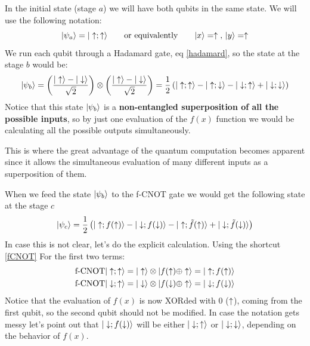 In the initial state (stage $a$) we will have both qubits in the same state. We will use the following notation:
\begin{equation}
  |\psi_{a}\rangle = |\uparrow;\uparrow\rangle \quad\quad\text{or equivalently}\quad\quad
  |x\rangle=\uparrow\text{, }|y\rangle=\uparrow
\end{equation}
We run each qubit through a Hadamard gate, eq \eqref{hadamard}, so the state at the stage $b$ would be:
\begin{equation}
  |\psi_{b}\rangle =
  \left(\frac{|\uparrow\rangle-|\downarrow\rangle}{\sqrt{2}}\right)\otimes
  \left(\frac{|\uparrow\rangle-|\downarrow\rangle}{\sqrt{2}}\right) =
  \frac{1}{2}\left(|\uparrow;\uparrow\rangle-|\uparrow;\downarrow\rangle-
  |\downarrow;\uparrow\rangle+|\downarrow;\downarrow\rangle\right)
\end{equation}
Notice that this state $|\psi_b\rangle$ is a \textbf{non-entangled superposition of all the possible inputs}, so by just one evaluation of the $f(x)$ function we would be calculating all the possible outputs simultaneously.

This is where the great advantage of the quantum computation becomes apparent since it allows the simultaneous evaluation of many different inputs as a superposition of them.

When we feed the state $|\psi_b\rangle$ to the f-CNOT gate we would get the following state at the stage $c$
\begin{equation}
  |\psi_{c}\rangle = \frac{1}{2}
  \left(|\uparrow;f(\uparrow)\rangle - |\downarrow;f(\downarrow)\rangle - |\uparrow;\tilde{f}(\uparrow)\rangle+
  |\downarrow;\tilde{f}(\downarrow)\rangle \right)
\end{equation}
In case this is not clear, let's do the explicit calculation. Using the shortcut \eqref{fCNOT}
For the first two terms:
\begin{equation}
  \begin{split}
    \text{f-CNOT}|\uparrow;\uparrow\rangle &=
    |\uparrow\rangle\otimes|f(\uparrow)\oplus\uparrow\rangle =|\uparrow;f(\uparrow)\rangle\\
    \text{f-CNOT}|\downarrow;\uparrow\rangle &=
    |\downarrow\rangle\otimes|f(\downarrow)\oplus \uparrow\rangle = |\downarrow;f(\downarrow)\rangle
  \end{split}
\end{equation}
Notice that the evaluation of $f(x)$ is now XORded with 0 ($\uparrow$), coming from the first qubit, so the second qubit should not be modified.
In case the notation gets messy let's point out that $|\downarrow;f(\downarrow)\rangle$ will be either $|\downarrow;\uparrow\rangle$ or $|\downarrow;\downarrow\rangle$, depending on the behavior of $f(x)$.

